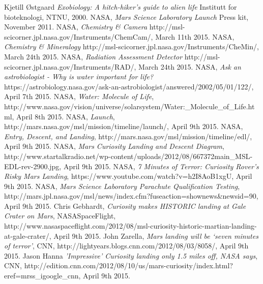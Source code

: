 ﻿\begin{thebibliography}{99}	%
		Kjetill Østgaard
		\emph{Exobiology: A hitch-hiker's guide to alien life}
		Institutt for bioteknologi,
		NTNU,
		2000.
		NASA,
		\emph{Mars Science Laboratory Launch}
		Press kit,
		November 2011.
		NASA,
		\emph{Chemistry \& Camera}
		http://msl-scicorner.jpl.nasa.gov/Instruments/ChemCam/,
		March 11th 2015.
		NASA,
		\emph{Chemistry \& Mineralogy}
		http://msl-scicorner.jpl.nasa.gov/Instruments/CheMin/,
		March 24th 2015.
		NASA,
		\emph{Radiation Assessment Detector}
		http://msl-scicorner.jpl.nasa.gov/Instruments/RAD/,
		March 24th 2015.
		NASA,
		\emph{Ask an astrobiologist - Why is water important for life?}
		https://astrobiology.nasa.gov/ask-an-astrobiologist/answered/2002/05/01/122/,
		April 7th 2015.
		NASA,
		\emph{Water: Molecule of Life},
		http://www.nasa.gov/vision/universe/solarsystem/Water:\_Molecule\_of\_Life.html,
		April 8th 2015.
		NASA,
		\emph{Launch},
		http://mars.nasa.gov/msl/mission/timeline/launch/,
		April 9th 2015.
		NASA,
		\emph{Entry, Descent, and Landing},
		http://mars.nasa.gov/msl/mission/timeline/edl/,
		April 9th 2015.
		NASA,
		\emph{Mars Curiosity Landing and Descent Diagram},
		http://www.startalkradio.net/wp-content/uploads/2012/08/667372main\_MSL-EDL-rev-2900.jpg,
		April 9th 2015.
		NASA,
		\emph{7 Minutes of Terror: Curiosity Rover's Risky Mars Landing},
		https://www.youtube.com/watch?v=h2I8AoB1xgU,
		April 9th 2015.
		NASA,
		\emph{Mars Science Laboratory Parachute Qualification Testing},
		http://mars.jpl.nasa.gov/msl/news/index.cfm?fuseaction=shownews\&newsid=90,
		April 9th 2015.
		Chris Gebhardt,
		\emph{Curiosity makes HISTORIC landing at Gale Crater on Mars},
		NASASpaceFlight,
		http://www.nasaspaceflight.com/2012/08/msl-curiosity-historic-martian-landing-at-gale-crater/,
		April 9th 2015.
		John Zarella,
		\emph{Mars landing will be ‘seven minutes of terror’},
		CNN,
		http://lightyears.blogs.cnn.com/2012/08/03/8058/,
		April 9th 2015.
		Jason Hanna
		\emph{'Impressive' Curiosity landing only 1.5 miles off, NASA says},
		CNN,
		http://edition.cnn.com/2012/08/10/us/mars-curiosity/index.html?eref=mrss\_igoogle\_cnn,
		April 9th 2015.

\end{thebibliography}
